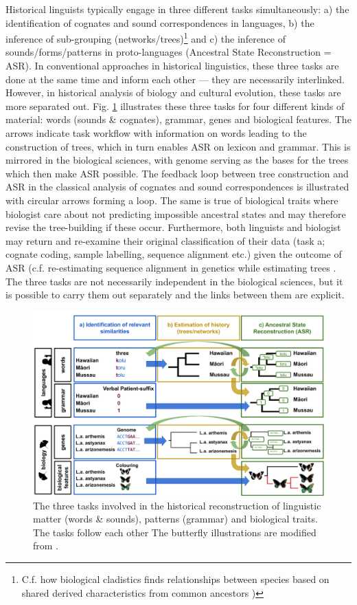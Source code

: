 \documentclass[12pt,letterpaper]{article}
\begin{document}
Historical linguists typically engage in three different tasks simultaneously: a) the identification of cognates and sound correspondences in languages, b) the inference of sub-grouping (networks/trees)\footnote{C.f. how biological cladistics finds relationships between species based on shared derived characteristics from common ancestors \citep[16-17]{maclaurin2008biodiversity})} and c) the inference of sounds/forms/patterns in proto-languages (Ancestral State Reconstruction = ASR). In conventional approaches in historical linguistics, these three tasks are done at the same time and inform each other --- they are necessarily interlinked. However, in historical analysis of biology and cultural evolution, these tasks are more separated out. Fig. \ref{fig:HL_tasks} illustrates these three tasks for four different kinds of material: words (sounds \& cognates), grammar, genes and biological features. The arrows indicate task workflow with information on words leading to the construction of trees, which in turn enables ASR on lexicon and grammar. This is mirrored in the biological sciences, with genome serving as the bases for the trees which then make ASR possible. The feedback loop between tree construction and ASR in the classical analysis of cognates and sound correspondences is illustrated with circular arrows forming a loop. The same is true of biological traits where biologist care about not predicting impossible ancestral states \citep{schulmeister2004comparative} and may therefore revise the tree-building if these occur. Furthermore, both linguists and biologist may return and re-examine their original classification of their data (task a; cognate coding, sample labelling, sequence alignment etc.) given the outcome of ASR (c.f. re-estimating sequence alignment in genetics while estimating trees \citep{10.1093/bioinformatics/btab129}. The three tasks are not necessarily independent in the biological sciences, but it is possible to carry them out separately and the links between them are explicit. 

\begin{figure}
\centering
\includegraphics[width=22cm]{illustrations/ASR_HL_explainer_ill.png}
\caption{The three tasks involved in the historical reconstruction of linguistic matter (words \& sounds), patterns (grammar) and biological traits. The tasks follow each other 
The butterfly illustrations are modified from \citet{savage2009single}.}
\label{fig:HL_tasks}
\end{figure}
\end{document}
